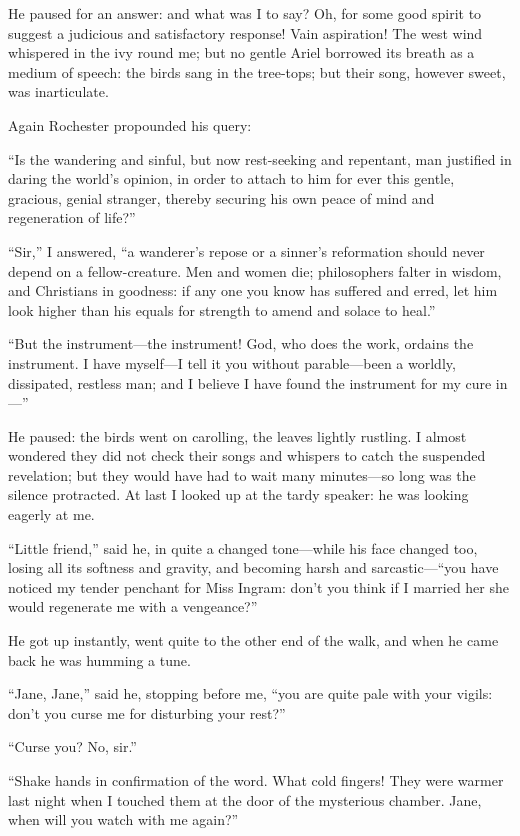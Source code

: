 He paused for an answer: and what was I to say? Oh, for some good
spirit to suggest a judicious and satisfactory response! Vain
aspiration! The west wind whispered in the ivy round me; but no gentle
Ariel borrowed its breath as a medium of speech: the birds sang in the
tree-tops; but their song, however sweet, was inarticulate.

Again \Mr{} Rochester propounded his query:

\enquote{Is the wandering and sinful, but now rest-seeking and
	repentant, man justified in daring the world's opinion, in order to
	attach to him for ever this gentle, gracious, genial stranger, thereby
	securing his own peace of mind and regeneration of life?}

\enquote{Sir,} I answered, \enquote{a wanderer's repose or a sinner's
	reformation should never depend on a fellow-creature. Men and women
	die; philosophers falter in wisdom, and Christians in goodness: if any
	one you know has suffered and erred, let him look higher than his equals
	for strength to amend and solace to heal.}

\enquote{But the instrument---the instrument! God, who does the work,
	ordains the instrument. I have myself---I tell it you without
	parable---been a worldly, dissipated, restless man; and I believe I have
	found the instrument for my cure in---}

He paused: the birds went on carolling, the leaves lightly rustling. I
almost wondered they did not check their songs and whispers to catch the
suspended revelation; but they would have had to wait many minutes---so
long was the silence protracted. At last I looked up at the tardy
speaker: he was looking eagerly at me.

\enquote{Little friend,} said he, in quite a changed tone---while his
face changed too, losing all its softness and gravity, and becoming
harsh and sarcastic---\enquote{you have noticed my tender penchant for
	Miss Ingram: don't you think if I married her she would regenerate me
	with a vengeance?}

He got up instantly, went quite to the other end of the walk, and when
he came back he was humming a tune.

\enquote{Jane, Jane,} said he, stopping before me, \enquote{you are
	quite pale with your vigils: don't you curse me for disturbing your
	rest?}

\enquote{Curse you? No, sir.}

\enquote{Shake hands in confirmation of the word. What cold fingers!
	They were warmer last night when I touched them at the door of the
	mysterious chamber. Jane, when will you watch with me again?}


